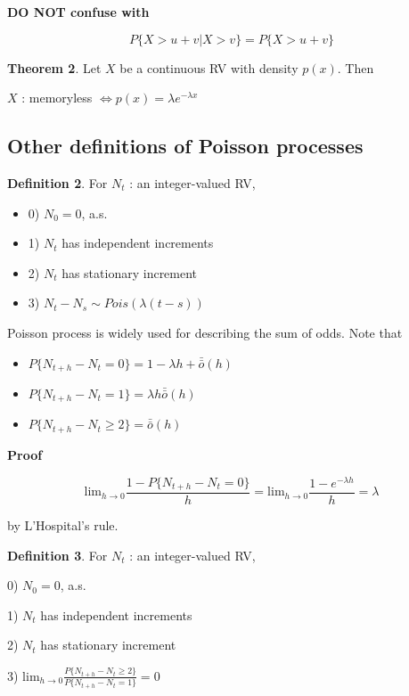 \documentclass[12pt]{article}
\theoremstyle{nonumberbreak}
\begin{document}
\textbf{DO NOT confuse with}

$$
P \{ X > u + v  | X > v\} = P\{ X > u + v\}
$$


\begin{theorem}
\textbf{Theorem 2}. Let $X$ be a continuous RV with density $p(x)$. Then

\begin{center}
$X$ : memoryless $\Leftrightarrow p(x) = \lambda e^{-\lambda x}$
\end{center}

\end{theorem}



\subsection{Other definitions of Poisson processes}


\begin{theorem}
\textbf{Definition 2}. For $N_t$ : an integer-valued RV,

\begin{itemize}
	\item 0) $N_0 = 0$, a.s.
	\item 1) $N_t$ has independent increments 
	\item 2) $N_t$ has stationary increment 
	\item 3) $N_t - N_s \sim Pois (\lambda (t-s))$
\end{itemize}
\end{theorem}


Poisson process is widely used for describing the sum of odds. Note that


\begin{theorem}
\begin{itemize}
	\item $P\{ N_{t+h} - N_t = 0 \} = 1 - \lambda h + \bar{\bar{o}}(h)$
	\item $P\{ N_{t+h} - N_t = 1 \} = \lambda h \bar{\bar{o}}(h)$
	\item $P\{ N_{t+h} - N_t \ge 2 \} = \bar{\bar{o}}(h)$
\end{itemize}
\end{theorem}

\textbf{Proof} 

$$
\mathrm{lim}_{h \to 0} \frac{1 - P\{ N_{t+h} - N_t = 0 \}}{h} = \mathrm{lim}_{h \to 0} \frac{1-e^{-\lambda h}}{h} = \lambda
$$

by L'Hospital's rule.


\begin{theorem}
\textbf{Definition 3}. For $N_t$ : an integer-valued RV,
	\item 0) $N_0 = 0$, a.s.
	\item 1) $N_t$ has independent increments
	\item 2) $N_t$ has stationary increment 
	\item 3) $\mathrm{lim}_{h \to 0} \frac{P\{ N_{t+h} - N_t \ge 2 \}}{P\{ N_{t+h} - N_t = 1 \}} = 0 $
\end{theorem}
\end{document}
